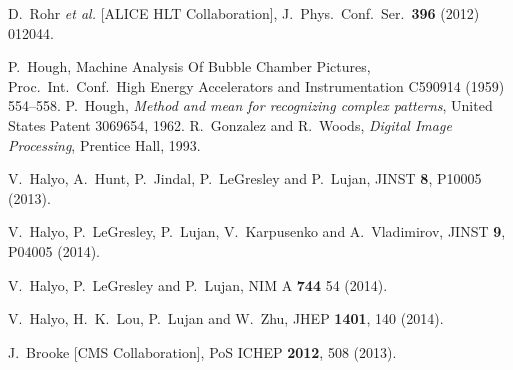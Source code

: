 \documentclass[aps,prl,twocolumn,preprintnumbers,groupedaddress,nofootinbib]{revtex4}
\begin{document}
\begin{thebibliography}{99}
  D.~Rohr {\it et al.}  [ALICE HLT Collaboration],
  J.\ Phys.\ Conf.\ Ser.\  {\bf 396} (2012) 012044.

P.~Hough, Machine Analysis Of Bubble Chamber Pictures, Proc.~Int.~Conf.~High Energy Accelerators and Instrumentation C590914 (1959) 554--558.
P.~Hough, {\it Method and mean for recognizing complex patterns}, United States Patent 3069654, 1962.
R.~Gonzalez and R.~Woods, {\it Digital Image Processing}, Prentice Hall, 1993.

  V.~Halyo, A.~Hunt, P.~Jindal, P.~LeGresley and P.~Lujan,
  JINST {\bf 8}, P10005 (2013).

  V.~Halyo, P.~LeGresley, P.~Lujan, V.~Karpusenko and A.~Vladimirov,
  JINST {\bf 9}, P04005 (2014).
  
  V.~Halyo, P.~LeGresley and P.~Lujan,
  NIM A  {\bf 744} 54 (2014).

  V.~Halyo, H.~K.~Lou, P.~Lujan and W.~Zhu,
  JHEP {\bf 1401}, 140 (2014).

  J.~Brooke [CMS Collaboration],
  PoS ICHEP {\bf 2012}, 508 (2013).
  

\end{thebibliography}
\end{document}
